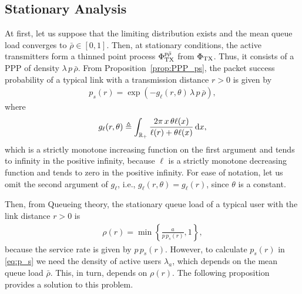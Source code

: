 
\subsection{Stationary Analysis}
\label{sec:stat}

At first, let us suppose that the limiting distribution exists and the mean queue load converges to $\bar\rho \in [0,1]$.
%
Then, at stationary conditions, the active transmitters form a thinned point process $\Phi^{p\bar\rho}_{\mathrm{TX}}$ from $\Phi_{\mathrm{TX}}$. Thus, it consists of a PPP of density $\lambda\,p\,\bar\rho$.
%
From Proposition~\ref{prop:PPP_ps}, the packet success probability of a typical link with a transmission distance $r > 0$ is given by 
\begin{align} \label{eq:p_s}
    p_s(r) = \exp\left(- g_\ell(r,\theta)\,\lambda\,p\,\bar\rho \right),
\end{align}
where \vspace{-2mm}
$$\displaystyle g_\ell(r,\theta) \triangleq \int_{{\mathbb R}_+}\frac{2\pi \, x\, \theta \ell(x)}{\ell(r)+\theta \ell(x)}\, \mathrm{d} x,$$
which is a strictly monotone increasing function on the first argument and tends to infinity in the positive infinity, because $\ell$ is a strictly monotone decreasing function and tends to zero in the positive infinity.
%
For ease of notation, let us omit the second argument of $g_\ell$, i.e., $g_\ell(r,\theta) = g_\ell(r)$, since $\theta$ is a constant.

Then, from Queueing theory, the stationary queue load of a typical user with the link distance $r > 0$ is
\begin{align}\label{eq:rho_r}
    \rho(r) = \min\left\{ \frac{a}{p\,p_s(r)}, 1 \right\},
\end{align}
because the service rate is given by $p\,p_s(r)$.
%
However, to calculate $p_s(r)$ in \eqref{eq:p_s} we need the density of active users $\lambda_a$, which depends on the mean queue load $\bar\rho$. This, in turn, depends on $\rho(r)$. The following proposition provides a solution to this problem.

